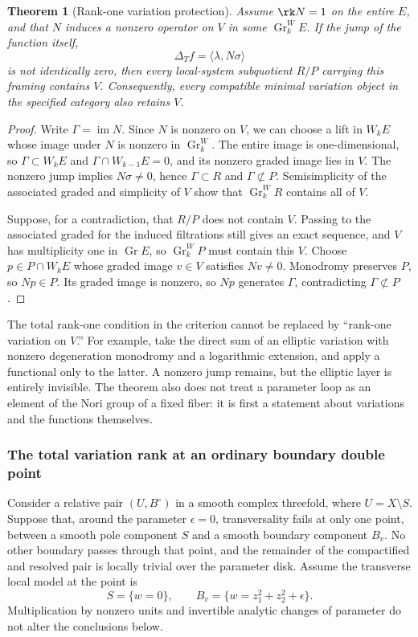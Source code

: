 \documentclass[11pt,a4paper,oneside]{article}
\theoremstyle{plain}
\newtheorem{theorem}{Theorem}[section]
\theoremstyle{definition}
\theoremstyle{remark}
\newcommand{\im}{\operatorname{im}}
\numberwithin{equation}{section}
\begin{document}
\begin{theorem}[Rank-one variation protection]\label{unified:thm:rankonevisibility}
Assume $\rk N=1$ on the entire $E$, and that $N$ induces a nonzero operator
on $V$ in some $\operatorname{Gr}^W_kE$.
If the jump of the function itself,
\[
 \Delta_T f=\langle\lambda,N\sigma\rangle
\]
is not identically zero, then every local-system subquotient $R/P$ carrying this framing contains $V$.
Consequently, every compatible minimal variation object in the specified category also retains $V$.
\end{theorem}
\begin{proof}
Write $\Gamma=\im N$. Since $N$ is nonzero on $V$,
we can choose a lift in $W_kE$ whose image under $N$ is nonzero in $\operatorname{Gr}_k^W$.
The entire image is one-dimensional, so
$\Gamma\subset W_kE$ and $\Gamma\cap W_{k-1}E=0$,
and its nonzero graded image lies in $V$.
The nonzero jump implies $N\sigma\ne0$, hence
$\Gamma\subset R$ and $\Gamma\not\subset P$.
Semisimplicity of the associated graded and simplicity of $V$ show that $\operatorname{Gr}_k^WR$ contains all of $V$.

Suppose, for a contradiction, that $R/P$ does not contain $V$. Passing to the associated graded for the induced filtrations still gives an exact sequence,
and $V$ has multiplicity one in $\operatorname{Gr}E$,
so $\operatorname{Gr}_k^WP$ must contain this $V$.
Choose $p\in P\cap W_kE$ whose graded image $v\in V$ satisfies $Nv\ne0$.
Monodromy preserves $P$, so $Np\in P$. Its graded image is nonzero,
so $Np$ generates $\Gamma$, contradicting $\Gamma\not\subset P$.
\end{proof}

The total rank-one condition in the criterion cannot be replaced by ``rank-one variation on $V$.''
For example, take the direct sum of an elliptic variation with nonzero degeneration monodromy and a logarithmic extension,
and apply a functional only to the latter. A nonzero jump remains, but the elliptic layer is entirely invisible.
The theorem also does not treat a parameter loop as an element of the Nori group of a fixed fiber:
it is first a statement about variations and the functions themselves.

\subsubsection{The total variation rank at an ordinary boundary double point}
Consider a relative pair $(U,B^\circ)$ in a smooth complex threefold,
where $U=X\setminus S$. Suppose that, around the parameter $\epsilon=0$, transversality fails at only one point,
between a smooth pole component $S$ and a smooth boundary component $B_v$.
No other boundary passes through that point, and the remainder of the compactified and resolved pair is locally trivial over the parameter disk.
Assume the transverse local model at the point is
\begin{equation}\label{unified:eq:boundarypinchmodel}
 S=\{w=0\},\qquad
 B_v=\{w=z_1^2+z_2^2+\epsilon\}.
\end{equation}
Multiplication by nonzero units and invertible analytic changes of parameter do not alter the conclusions below.
\end{document}
